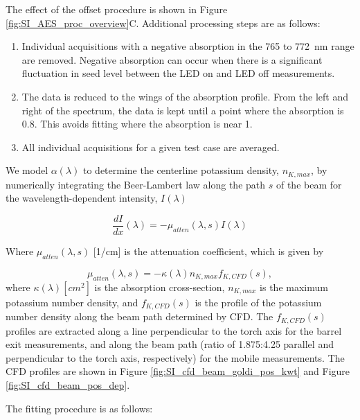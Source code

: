 The effect of the offset procedure is shown in Figure \ref{fig:SI_AES_proc_overview}C. Additional processing steps are as follows:

\begin{enumerate}
    \item Individual acquisitions with a negative absorption in the 765 to \SI{772}{\nano\meter} range are removed. Negative absorption can occur when there is a significant fluctuation in seed level between the LED on and LED off measurements.
    \item The data is reduced to the wings of the absorption profile. From the left and right of the spectrum, the data is kept until a point where the absorption is 0.8. This avoids fitting where the absorption is near 1. 
    \item All individual acquisitions for a given test case are averaged.
\end{enumerate}

We model $\alpha(\lambda)$ to determine the centerline potassium density, $n_{K,max}$, by numerically integrating the Beer-Lambert law along the path $s$ of the beam for the wavelength-dependent intensity, $I(\lambda)$

\begin{equation}
    \frac{dI}{dx}(\lambda) = -\mu_{atten}(\lambda, s) I(\lambda)
\end{equation}

Where $\mu_{atten} (\lambda, s)$ [1/cm] is the attenuation coefficient, which is given by 

\begin{equation}
    \mu_{atten}(\lambda, s) = -\kappa(\lambda) n_{K,max} f_{K, CFD}(s),
\end{equation}
where $\kappa(\lambda) [cm^2]$ is the absorption cross-section, $n_{K,max}$ is the maximum potassium number density, and $f_{K, CFD}(s)$ is the profile of the potassium number density along the beam path determined by CFD. The $f_{K, CFD}(s)$ profiles are extracted along a line perpendicular to the torch axis for the barrel exit measurements, and along the beam path (ratio of 1.875:4.25 parallel and perpendicular to the torch axis, respectively) for the mobile measurements. The CFD profiles are shown in Figure \ref{fig:SI_cfd_beam_goldi_pos_kwt} and Figure \ref{fig:SI_cfd_beam_pos_dep}.

The fitting procedure is as follows:


